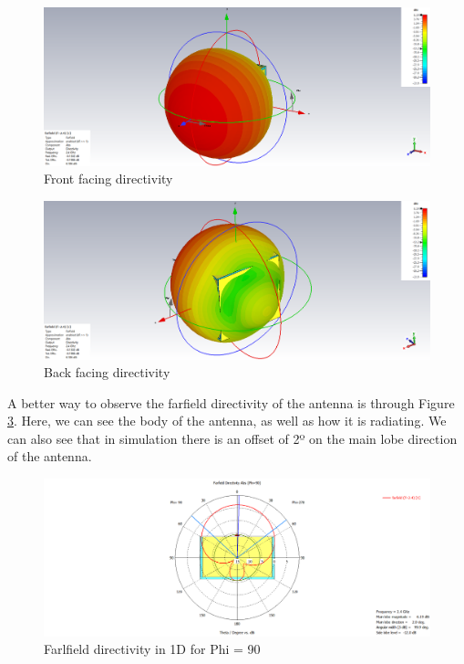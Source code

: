 \begin{figure}[H]
    \vspace*{0cm}
    \centering
    \includegraphics[width=0.9\linewidth]{figs/ch3_farfield.png}
    \caption{Front facing directivity}
    \label{fig:ch3_farfield.PNG}
\end{figure}

\begin{figure}[H]
    \vspace*{0cm}
    \centering
    \includegraphics[width=0.9\linewidth]{figs/ch3_farfieldBack.png}
    \caption{Back facing directivity}
    \label{fig:ch3_farfieldBack.png}
\end{figure}

\par A better way to observe the farfield directivity of the antenna is through Figure \ref{fig:ch3_farfield1D.png}. Here, we can see the body of the antenna, as well as how it is radiating. We can also see that in simulation there is an offset of 2º on the main lobe direction of the antenna.

\begin{figure}[H]
    \vspace*{0cm}
    \centering
    \includegraphics[width=0.9\linewidth]{figs/ch3_farfield1D.png}
    \caption{Farlfield directivity in 1D for Phi = 90}
    \label{fig:ch3_farfield1D.png}
\end{figure}

